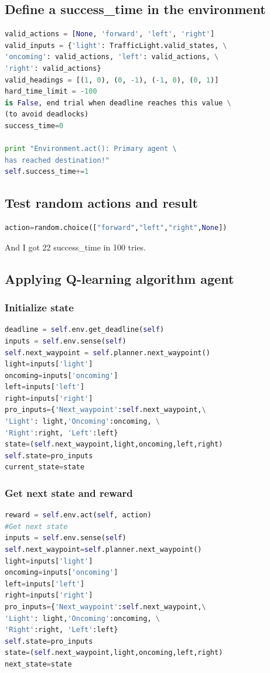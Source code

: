\documentclass[11pt,a4paper]{article}
\begin{document}
\subsection {Define a success\_time in the environment}
\begin{lstlisting}[language={Python}]
valid_actions = [None, 'forward', 'left', 'right']
valid_inputs = {'light': TrafficLight.valid_states, \
'oncoming': valid_actions, 'left': valid_actions, \
'right': valid_actions}
valid_headings = [(1, 0), (0, -1), (-1, 0), (0, 1)]
hard_time_limit = -100
is False, end trial when deadline reaches this value \
(to avoid deadlocks)
success_time=0

print "Environment.act(): Primary agent \
has reached destination!"
self.success_time+=1
\end{lstlisting}
\subsection {Test random actions and result}
\begin{lstlisting}[language={Python}]
action=random.choice(["forward","left","right",None])
\end{lstlisting}
And I got 22 success\_time in 100 tries.
\subsection {Applying Q-learning algorithm agent}
\subsubsection{Initialize state}
\begin{lstlisting}[language={Python}]
deadline = self.env.get_deadline(self)
inputs = self.env.sense(self)
self.next_waypoint = self.planner.next_waypoint()
light=inputs['light']
oncoming=inputs['oncoming']
left=inputs['left']
right=inputs['right']
pro_inputs={'Next_waypoint':self.next_waypoint,\
'Light': light,'Oncoming':oncoming, \
'Right':right, 'Left':left}
state=(self.next_waypoint,light,oncoming,left,right)
self.state=pro_inputs
current_state=state
\end{lstlisting}
\subsubsection{Get next state and reward}
\begin{lstlisting}[language={Python}]
reward = self.env.act(self, action)
#Get next state
inputs = self.env.sense(self)
self.next_waypoint=self.planner.next_waypoint()
light=inputs['light']
oncoming=inputs['oncoming']
left=inputs['left']
right=inputs['right']
pro_inputs={'Next_waypoint':self.next_waypoint,\
'Light': light,'Oncoming':oncoming, \
'Right':right, 'Left':left}
self.state=pro_inputs
state=(self.next_waypoint,light,oncoming,left,right)
next_state=state
\end{lstlisting}
\end{document}
